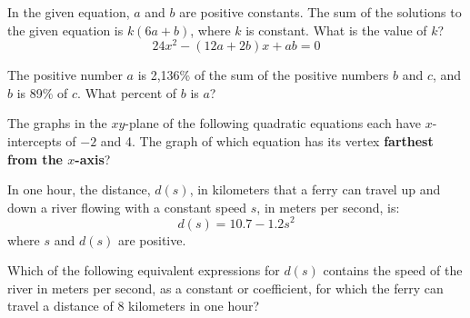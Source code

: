 \noindent\markforreview
\vspace{1em}

In the given equation, \(a\) and \(b\) are positive constants.
The sum of the solutions to the given equation is \(k(6a + b)\), where \(k\) is constant.
What is the value of \(k\)?
\[
24x^2 - (12a + 2b)x + ab = 0
\]

\vspace{0.75em}


\vspace{2em}
\newpage

\noindent\markforreview
\vspace{1em}

The positive number \(a\) is 2,136\% of the sum of the positive numbers \(b\) and \(c\),
and \(b\) is 89\% of \(c\). What percent of \(b\) is \(a\)?

\vspace{0.75em}


\vspace{2em}
\newpage

\noindent\markforreview
\vspace{1em}

The graphs in the \(xy\)-plane of the following quadratic equations each have
\(x\)-intercepts of \(-2\) and 4. The graph of which equation has its vertex
\textbf{farthest from the \(x\)-axis}?

\vspace{0.75em}


\vspace{2em}
\newpage

\noindent\markforreview
\vspace{1em}

In one hour, the distance, \(d(s)\), in kilometers that a ferry can travel up and down a river
flowing with a constant speed \(s\), in meters per second, is:
\[
d(s) = 10.7 - 1.2s^2
\]
where \(s\) and \(d(s)\) are positive.

Which of the following equivalent expressions for \(d(s)\) contains the speed
of the river in meters per second, as a constant or coefficient, for which
the ferry can travel a distance of 8 kilometers in one hour?

